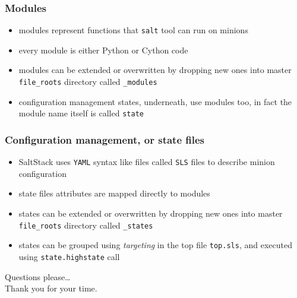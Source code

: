 \documentclass[compress]{beamer}
\begin{document}
\begin{frame}
\frametitle{Modules}

\begin{itemize}[<+->]
  \item modules represent functions that \texttt{salt} tool can run on minions
  \item every module is either Python or Cython code
  \item modules can be extended or overwritten by dropping new ones into master \texttt{file\_roots} directory called \texttt{\_modules}
  \item configuration management states, underneath, use modules too, in fact the module name itself is called \texttt{state}
\end{itemize}
\end{frame}

\begin{frame}
\frametitle{Configuration management, or state files}

\begin{itemize}[<+->]
  \item SaltStack uses \texttt{YAML} syntax like files called \texttt{SLS} files to describe minion configuration
  \item state files attributes are mapped directly to modules
  \item states can be extended or overwritten by dropping new ones into master \texttt{file\_roots} directory called \texttt{\_states}
  \item states can be grouped using \emph{targeting} in the top file \texttt{top.sls}, and executed using \texttt{state.highstate} call
\end{itemize}
\end{frame}

\begin{frame}
  \begin{center}
  \huge Questions please\ldots
  \\
  Thank you for your time.
  \end{center}
\end{frame}
\end{document}

